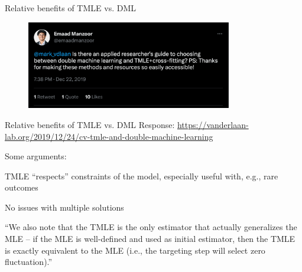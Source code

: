 \documentclass[xcolor={table}]{beamer}
\begin{document}
\begin{frame}{Relative benefits of TMLE vs. DML}

\begin{figure}
\centering
\includegraphics[width = 0.8\textwidth]{../assets/tmle-dml-empirical-tweet.png}
\end{figure}
\hfill
\end{frame}


\begin{frame}{Relative benefits of TMLE vs. DML}
Response: \url{https://vanderlaan-lab.org/2019/12/24/cv-tmle-and-double-machine-learning}\pause

Some arguments: \pause
\begin{wideitemize}
\item TMLE ``respects'' constraints of the model, especially useful with, e.g., rare outcomes \citep{balzer2016estimating}\pause
\item No issues with multiple solutions\pause
\item ``We also note that the TMLE is the only estimator that actually generalizes the MLE – if the MLE is well-defined and used as initial estimator, then the TMLE is exactly equivalent to the MLE (i.e., the targeting step will select zero fluctuation).'' 
\end{wideitemize}

\end{frame}


\end{document}
